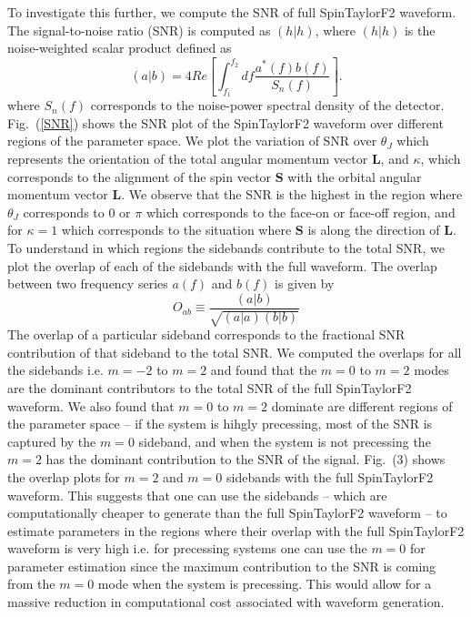 To investigate this further, we compute the SNR of 
full SpinTaylorF2 waveform. The signal-to-noise ratio (SNR) is computed as $(h|h)$, where $(h|h)$ is the noise-weighted scalar product defined as
\label{inner_product}
\begin{equation}
(a|b) = 4 Re \left[ \int_{f_{1}}^{f_{2}} df \dfrac{a^{*}(f)b(f)}{S_{n}(f)}\right].
\end{equation}
where $S_{n}(f)$ corresponds to the noise-power spectral density of the detector. Fig.~(\ref{SNR}) shows the SNR plot of the SpinTaylorF2 waveform 
over different regions of the parameter space. We plot the variation of SNR over $\theta_{J}$ which represents the orientation of the 
total angular momentum vector $\mathbf{L}$, and $\kappa$, which corresponds to the alignment of the spin vector 
$\mathbf{S}$ with the orbital angular momentum vector $\mathbf{L}$. We observe that the SNR is the highest in the region where $\theta_{J}$ corresponds to $0$ or $\pi$ which corresponds to the face-on or face-off region, and for $\kappa = 1$ which corresponds to the situation where $\mathbf{S}$ is along the direction of $\mathbf{L}$. To understand in which regions the sidebands contribute to the total SNR, we plot the overlap of each of the sidebands with the full waveform. The overlap between two frequency series $a(f)$ and $b(f)$ is given by
\begin{equation}
O_{ab} \equiv \dfrac{(a|b)}{\sqrt{(a|a)(b|b)}}
\end{equation}
The overlap of a particular sideband corresponds to the fractional SNR contribution of that sideband to the total SNR. We computed the overlaps for all the sidebands i.e. $m=-2$ to $m=2$ and found that the $m=0$ to $m=2$ modes are the dominant contributors to the total SNR of the full SpinTaylorF2 waveform. We also found that $m=0$ to $m=2$ dominate are different regions of the parameter space -- if the system is hihgly precessing, most of the SNR is captured by the $m=0$ sideband, and when the system is not precessing the $m=2$ has the dominant contribution to the SNR of the signal. Fig.~(3) shows the overlap plots for $m=2$ and $m=0$ sidebands with the full SpinTaylorF2 waveform. This suggests that one can use the sidebands -- which are computationally cheaper to generate than the full SpinTaylorF2 waveform -- to estimate parameters in the regions where their overlap with the full SpinTaylorF2 waveform is very high i.e. for precessing systems one can use the $m=0$ for parameter estimation since the maximum contribution to the SNR is coming from the $m=0$ mode when the system is precessing. This would allow for a massive reduction in computational cost associated with waveform generation. 


